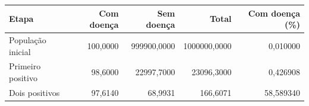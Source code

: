 \begin{tabular}{lrrrr}
\toprule
Etapa & Com doença & Sem doença & Total & Com doença (\%) \\
\midrule
População inicial & 100,0000 & 999900,0000 & 1000000,0000 & 0,010000 \\
Primeiro positivo & 98,6000 & 22997,7000 & 23096,3000 & 0,426908 \\
Dois positivos & 97,6140 & 68,9931 & 166,6071 & 58,589340 \\
\bottomrule
\end{tabular}
